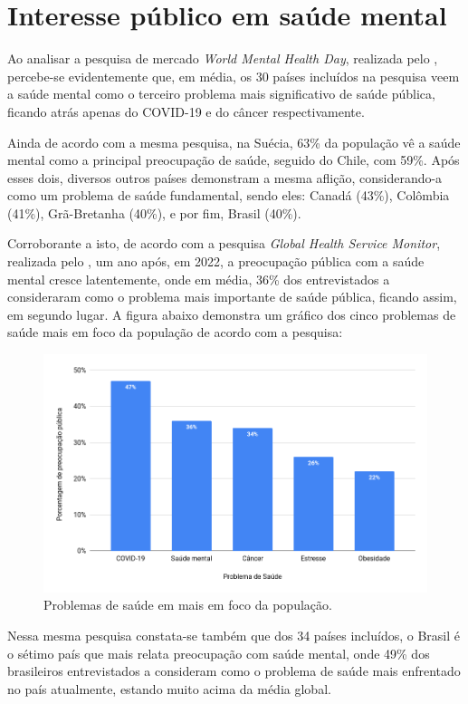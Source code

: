 \section{Interesse público em saúde mental}
\label{sec:interessePublico}

Ao analisar a pesquisa de mercado \textit{World Mental Health Day}, realizada pelo , percebe-se evidentemente que, em média, os 30 países incluídos na pesquisa veem a saúde mental como o terceiro problema mais significativo de saúde pública, ficando atrás apenas do COVID-19 e do câncer respectivamente.

Ainda de acordo com a mesma pesquisa, na Suécia, 63\% da população vê a saúde mental como a principal preocupação de saúde, seguido do Chile, com 59\%. Após esses dois, diversos outros países demonstram a mesma aflição, considerando-a como um problema de saúde fundamental, sendo eles: Canadá (43\%), Colômbia (41\%), Grã-Bretanha (40\%), e por fim, Brasil (40\%).

Corroborante a isto, de acordo com a pesquisa \textit{Global Health Service Monitor}, realizada pelo , um ano após, em 2022, a preocupação pública com a saúde mental cresce latentemente, onde em média, 36\% dos entrevistados a consideraram como o problema mais importante de saúde pública, ficando assim, em segundo lugar. A figura abaixo demonstra um gráfico dos cinco problemas de saúde mais em foco da população de acordo com a pesquisa:

\begin{figure}[H]
    \centering
    \caption{Problemas de saúde em mais em foco da população.}
    \label{fig:interessePublicoImg}
    \includegraphics[width=.8\textwidth]{data/figures/interesse-publico.png}
\end{figure}

Nessa mesma pesquisa constata-se também que dos 34 países incluídos, o Brasil é o sétimo país que mais relata preocupação com saúde mental, onde 49\% dos brasileiros entrevistados a consideram como o problema de saúde mais enfrentado no país atualmente, estando muito acima da média global.
